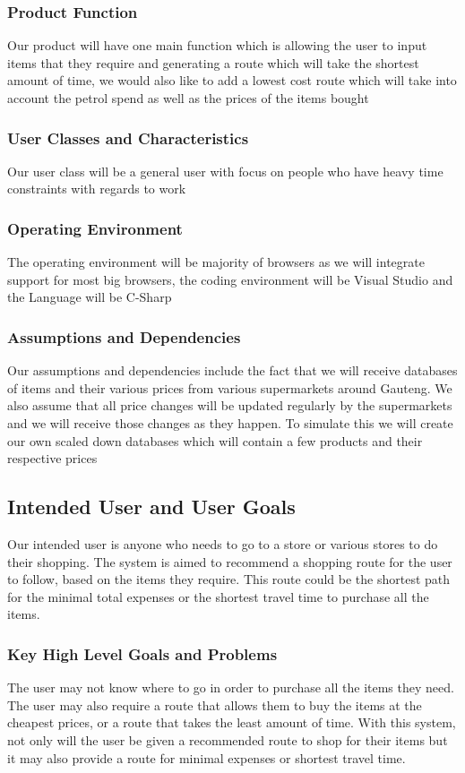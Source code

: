 \documentclass[12pt]{article}
\begin{document}
\subsubsection{Product Function}
Our product will have one main function which is allowing the user to input 
items that they require and generating a route which will take the shortest amount
of time, we would also like to add a lowest cost route which will take into account 
the petrol spend as well as the prices of the items bought
\subsubsection{User Classes and Characteristics}
Our user class will be a general user with focus
on people who have heavy time constraints with regards to work
\subsubsection{Operating Environment}
The operating environment will be majority of browsers as we will 
integrate support for most big browsers, the coding environment will be Visual Studio and the
Language will be C-Sharp
\subsubsection{Assumptions and Dependencies}
Our assumptions and dependencies include the fact that we will
receive databases of items and their various prices from various supermarkets around Gauteng.
We also assume that all price changes will be updated regularly by the supermarkets and we will 
receive those changes as they happen. To simulate this we will create our own scaled down databases
which will contain a few products and their respective prices


\subsection{Intended User and User Goals}
Our intended user is anyone who needs to go to a store or various stores to do their shopping. The system is aimed to recommend a shopping route for the user to follow, based on the items they require. This route could be the shortest path for the minimal total expenses or the shortest travel time to purchase all the items.
\subsubsection{Key High Level Goals and Problems}
The user may not know where to go in order to purchase all the items they need. The user may also require a route that allows them to buy the items at the cheapest prices, or a route that takes the least amount of time.
With this system, not only will the user be given a recommended route to shop for their items but it may also provide a route for minimal expenses or shortest travel time.
\end{document}
